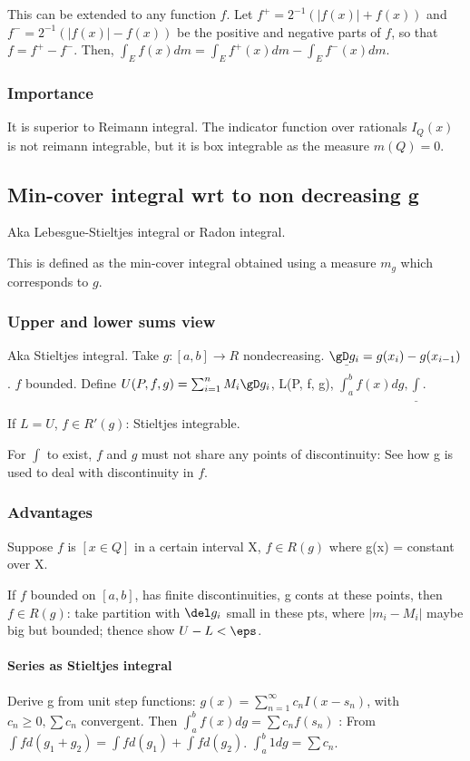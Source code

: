 \documentclass[oneside, article]{memoir}
\begin{document}
This can be extended to any function $f$. Let $f^+ = 2^{-1}(|f(x)| + f(x))$ and $f^- = 2^{-1}(|f(x)| - f(x))$ be the positive and negative parts of $f$, so that $f = f^+ - f^-$. Then, $\int_E f(x) dm = \int_E f^+(x) dm - \int_E f^-(x) dm$.

\subsubsection{Importance}
It is superior to Reimann integral. The indicator function over rationals $I_Q(x)$ is not reimann integrable, but it is box integrable as the measure $m(Q)=0$.

\subsection{Min-cover integral wrt to non decreasing g}
Aka Lebesgue-Stieltjes integral or Radon integral.

This is defined as the min-cover integral obtained using a measure $m_g$ which corresponds to $g$.

\subsubsection{Upper and lower sums view}
Aka Stieltjes integral. Take $g:[a,b] \to R$ nondecreasing. $\gD g_{i} = g(x_{i}) - g(x_{i-1})$. $f$ bounded. Define $U(P, f, g) = \sum_{i=1}^{n}M_{i}\gD g_{i}$, L(P, f, g), $\bar{\int_{a}^{b}}f(x) dg, \underline{\int}$.

If $L=U$, $f \in R'(g)$: Stieltjes integrable.

For $\int$ to exist, $f$ and $g$ must not share any points of discontinuity: See how g is used to deal with discontinuity in $f$.

\subsubsection{Advantages}
Suppose $f$ is $[x \in Q]$ in a certain interval X, $f \in R(g)$ where g(x) = constant over X.

If $f$ bounded on $[a, b]$, has finite discontinuities, g conts at these points, then $f \in R(g)$: take partition with $\del g_{i}$ small in these pts, where $|m_{i} - M_{i}|$ maybe big but bounded; thence show $U - L < \eps$.

\paragraph{Series as Stieltjes integral}
Derive g from unit step functions: $g(x) = \sum_{n=1}^{\infty} c_{n}I(x - s_{n})$, with $c_{n} \geq 0, \sum c_{n}$ convergent. Then $\int_{a}^{b}f(x) dg = \sum c_{n}f(s_{n})$ : From $\int f d(g_{1} + g_{2}) = \int f d(g_{1})+ \int f d(g_{2})$. $\int_{a}^{b}1 dg = \sum c_{n}$.
\end{document}
